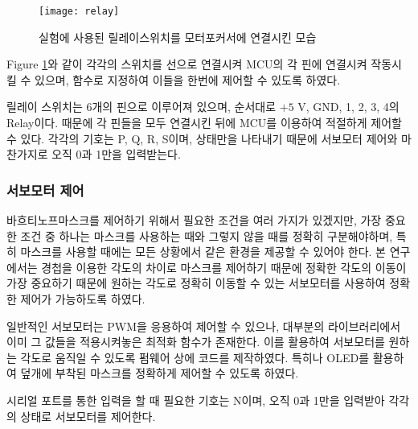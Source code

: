 \begin{figure}[h]
	\begin{center}
		\texttt{[image: relay]}
	\end{center}
	\caption{실험에 사용된 릴레이스위치를 모터포커서에 연결시킨 모습}
	\label{relay}
\end{figure}


\textrm{Figure} \ref{relay}와 같이 각각의 스위치를 선으로 연결시켜 MCU의 각 핀에 연결시켜 작동시킬 수 있으며, 함수로 지정하여 이들을 한번에 제어할 수 있도록 하였다.

릴레이 스위치는 6개의 핀으로 이루어져 있으며, 순서대로 $\textrm{+5 V}$, GND, 1, 2, 3, 4의 Relay이다. 때문에 각 핀들을 모두 연결시킨 뒤에 MCU를 이용하여 적절하게 제어할 수 있다. 각각의 기호는 P, Q, R, S이며, 상태만을 나타내기 때문에 서보모터 제어와 마찬가지로 오직 0과 1만을 입력받는다.



\subsubsection{서보모터 제어}
바흐티노프마스크를 제어하기 위해서 필요한 조건을 여러 가지가 있겠지만, 가장 중요한 조건 중 하나는 마스크를 사용하는 때와 그렇지 않을 때를 정확히 구분해야하며, 특히 마스크를 사용할 때에는 모든 상황에서 같은 환경을 제공할 수 있어야 한다. 본 연구에서는 경첩을 이용한 각도의 차이로 마스크를 제어하기 때문에 정확한 각도의 이동이 가장 중요하기 때문에 원하는 각도로 정확히 이동할 수 있는 서보모터를 사용하여 정확한 제어가 가능하도록 하였다.

일반적인 서보모터는 PWM을 응용하여 제어할 수 있으나, 대부분의 라이브러리에서 이미 그 값들을 적용시켜놓은 최적화 함수가 존재한다. 이를 활용하여 서보모터를 원하는 각도로 움직일 수 있도록 펌웨어 상에 코드를 제작하였다. 특히나 OLED를 활용하여 덮개에 부착된 마스크를 정확하게 제어할 수 있도록 하였다.

시리얼 포트를 통한 입력을 할 때 필요한 기호는 N이며, 오직 0과 1만을 입력받아 각각의 상태로 서보모터를 제어한다.




